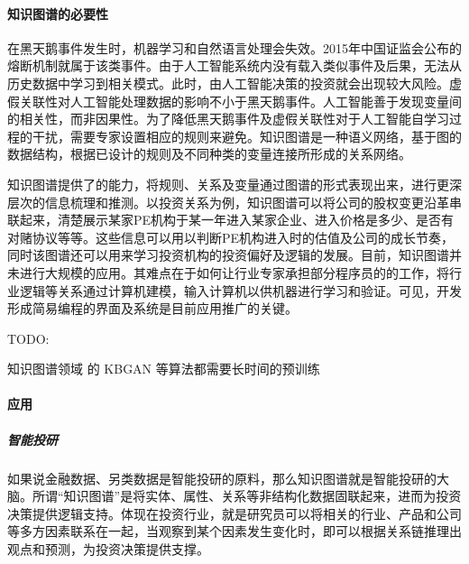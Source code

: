 \documentclass[letterpaper,10pt,english]{sphinxmanual}
\begin{document}
\paragraph{知识图谱的必要性}
\label{\detokenize{chapter_AI_dive/KG:id2}}
在黑天鹅事件发生时，机器学习和自然语言处理会失效。2015年中国证监会公布的熔断机制就属于该类事件。由于人工智能系统内没有载入类似事件及后果，无法从历史数据中学习到相关模式。此时，由人工智能决策的投资就会出现较大风险。虚假关联性对人工智能处理数据的影响不小于黑天鹅事件。人工智能善于发现变量间的相关性，而非因果性。为了降低黑天鹅事件及虚假关联性对于人工智能自学习过程的干扰，需要专家设置相应的规则来避免。知识图谱是一种语义网络，基于图的数据结构，根据已设计的规则及不同种类的变量连接所形成的关系网络。

知识图谱提供了的能力，将规则、关系及变量通过图谱的形式表现出来，进行更深层次的信息梳理和推测。以投资关系为例，知识图谱可以将公司的股权变更沿革串联起来，清楚展示某家PE机构于某一年进入某家企业、进入价格是多少、是否有对赌协议等等。这些信息可以用以判断PE机构进入时的估值及公司的成长节奏，同时该图谱还可以用来学习投资机构的投资偏好及逻辑的发展。目前，知识图谱并未进行大规模的应用。其难点在于如何让行业专家承担部分程序员的的工作，将行业逻辑等关系通过计算机建模，输入计算机以供机器进行学习和验证。可见，开发形成简易编程的界面及系统是目前应用推广的关键。%
\begin{footnote}[959]\sphinxAtStartFootnote
{}
%
\end{footnote}

TODO: 

知识图谱领域 的 KBGAN 等算法都需要长时间的预训练


\paragraph{应用}
\label{\detokenize{chapter_AI_dive/KG:id3}}

\subparagraph{智能投研}
\label{\detokenize{chapter_AI_dive/KG:id4}}
如果说金融数据、另类数据是智能投研的原料，那么知识图谱就是智能投研的大脑。所谓“知识图谱”是将实体、属性、关系等非结构化数据固联起来，进而为投资决策提供逻辑支持。体现在投资行业，就是研究员可以将相关的行业、产品和公司等多方因素联系在一起，当观察到某个因素发生变化时，即可以根据关系链推理出观点和预测，为投资决策提供支撑。
\end{document}
